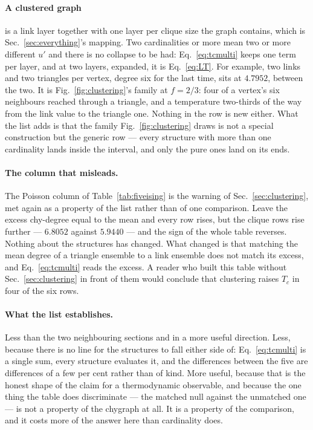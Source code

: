 \paragraph{A clustered graph} is a link layer together with one layer per clique
size the graph contains, which is Sec.~\ref{sec:everything}'s mapping. Two
cardinalities or more mean two or more different $u'$ and there is no collapse
to be had: Eq.~\eqref{eq:tcmulti} keeps one term per layer, and at two layers,
expanded, it is Eq.~\eqref{eq:LT}. For example, two links and two triangles per vertex,
degree six for the last time, sits at $4.7952$, between the two. It is Fig.~\ref{fig:clustering}'s family at
$f=2/3$: four of a vertex's six neighbours reached through a triangle, and a
temperature two-thirds of the way from the link value to the triangle one.
Nothing in the row is new either. What the list adds is that the family
Fig.~\ref{fig:clustering} draws is not a special construction but the generic
row --- every structure with more than one cardinality lands inside the
interval, and only the pure ones land on its ends.

\paragraph{The column that misleads.} The Poisson column of
Table~\ref{tab:fiveising} is the warning of Sec.~\ref{sec:clustering}, met again
as a property of the list rather than of one comparison. Leave the excess chy-degree equal to the mean and
every row rises, but the clique rows rise further --- $6.8052$ against $5.9440$
--- and the sign of the whole table reverses. Nothing about the structures has
changed. What changed is that matching the mean degree of a triangle ensemble to
a link ensemble does not match its excess, and Eq.~\eqref{eq:tcmulti} reads the
excess. A reader who built this table without Sec.~\ref{sec:clustering} in front
of them would conclude that clustering raises $T_{c}$ in four of the six rows.

\paragraph{What the list establishes.} Less than the two neighbouring sections
and in a more useful direction. Less, because there is no line for the
structures to fall either side of: Eq.~\eqref{eq:tcmulti} is a single sum, every
structure evaluates it, and the differences between the five are differences of
a few per cent rather than of kind. More useful, because that is the honest
shape of the claim for a thermodynamic observable, and because the one thing the
table does discriminate --- the matched null against the unmatched one --- is not
a property of the chygraph at all. It is a property of the comparison, and it
costs more of the answer here than cardinality does.

